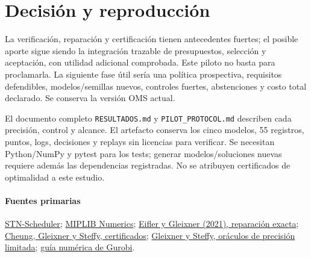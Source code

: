 \documentclass[11pt]{article}
\begin{document}
\section{Decisión y reproducción}
La verificación, reparación y certificación tienen antecedentes fuertes; el posible
aporte sigue siendo la integración trazable de presupuestos, selección y aceptación,
con utilidad adicional comprobada. Este piloto no basta para proclamarla.
La siguiente fase útil sería una política prospectiva, requisitos defendibles,
modelos/semillas nuevos, controles fuertes, abstenciones y costo total declarado.
Se conserva la versión OMS actual.

El documento completo \texttt{RESULTADOS.md} y \texttt{PILOT\_PROTOCOL.md}
describen cada precisión, control y alcance. El artefacto conserva los cinco modelos,
55 registros, puntos, logs, decisiones y replays sin licencias para verificar.
Se necesitan Python/NumPy y pytest para los tests; generar modelos/soluciones nuevas
requiere además las dependencias registradas. No se atribuyen certificados de
optimalidad a este estudio.

\paragraph{Fuentes primarias}
\href{https://github.com/jckantor/STN-Scheduler}{STN-Scheduler};
\href{https://miplib.zib.de/tag_numerics.html}{MIPLIB Numerics};
\href{https://arxiv.org/abs/2101.09141}{Eifler y Gleixner (2021), reparación exacta};
\href{https://arxiv.org/abs/1611.08832}{Cheung, Gleixner y Steffy, certificados};
\href{https://optimization-online.org/wp-content/uploads/2019/12/7507.pdf}{Gleixner y Steffy, oráculos de precisión limitada};
\href{https://docs.gurobi.com/projects/optimizer/en/current/concepts/numericguide/tolerances_scaling.html}{guía numérica de Gurobi}.
\end{document}
